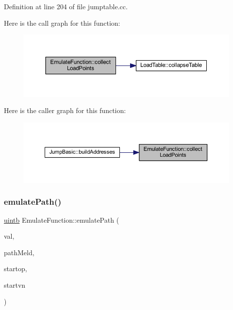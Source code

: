 Definition at line 204 of file jumptable.\+cc.

Here is the call graph for this function\+:
\nopagebreak
\begin{figure}[H]
\begin{center}
\leavevmode
\includegraphics[width=350pt]{class_emulate_function_a92c3d9ddc113361c767f598ac892a7e9_cgraph}
\end{center}
\end{figure}
Here is the caller graph for this function\+:
\nopagebreak
\begin{figure}[H]
\begin{center}
\leavevmode
\includegraphics[width=350pt]{class_emulate_function_a92c3d9ddc113361c767f598ac892a7e9_icgraph}
\end{center}
\end{figure}
\mbox{\label{class_emulate_function_a0b6a72cd2a09edc2f9ca29503c435259}} 
\subsubsection{\texorpdfstring{emulatePath()}{emulatePath()}}
{\footnotesize\ttfamily \mbox{\hyperlink{types_8h_a2db313c5d32a12b01d26ac9b3bca178f}{uintb}} Emulate\+Function\+::emulate\+Path (\begin{DoxyParamCaption}\item[{\mbox{\hyperlink{types_8h_a2db313c5d32a12b01d26ac9b3bca178f}{uintb}}}]{val,  }\item[{const \mbox{\hyperlink{class_path_meld}{Path\+Meld}} \&}]{path\+Meld,  }\item[{\mbox{\hyperlink{class_pcode_op}{Pcode\+Op}} $\ast$}]{startop,  }\item[{\mbox{\hyperlink{class_varnode}{Varnode}} $\ast$}]{startvn }\end{DoxyParamCaption})}



